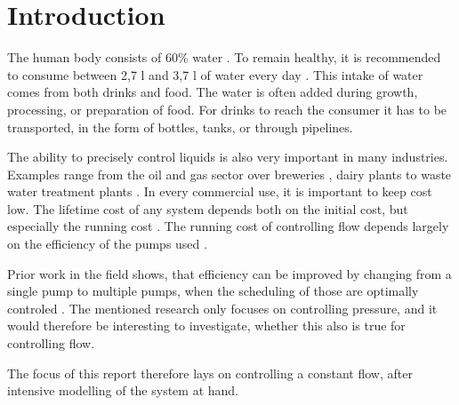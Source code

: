 \chapter{Introduction}\label{ch:introduction}
The human body consists of 60\% water \cite{HumanWater}.
To remain healthy, 
it is recommended to consume between 2,7 l and 3,7 l of water every day \cite{DailyWater}.
This intake of water comes from both drinks and food.
The water is often added during growth, processing, or preparation of food.
For drinks to reach the consumer it has to be transported, 
in the form of bottles, tanks, or through pipelines.

The ability to precisely control liquids is also very important in many industries.
Examples range from the oil and gas sector \cite{OilFlow} over breweries \cite{BrewFlow},
dairy plants \cite{DairyFlow} to waste water treatment plants \cite{WastewaterFlow}.
In every commercial use,
it is important to keep cost low.
The lifetime cost of any system depends both on the initial cost,
but especially the running cost \cite{LifetimeCost}.
The running cost of controlling flow depends largely on the efficiency of the pumps used \cite{Volk2014}.

Prior work in the field shows, 
that efficiency can be improved by changing from a single pump to multiple pumps,
when the scheduling of those are optimally controled \cite{YangMultiPump2008}. 
The mentioned research only focuses on controlling pressure,
and it would therefore be interesting to investigate, 
whether this also is true for controlling flow.


The focus of this report therefore lays on controlling a constant flow,
after intensive modelling of the system at hand.
%
%
%
%
%
%
%
%
%
%
%
%

